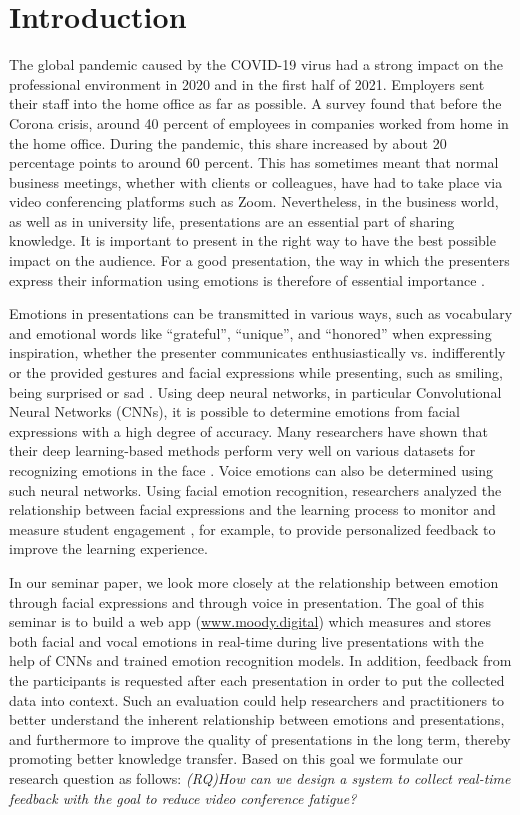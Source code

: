 \section{Introduction}
\label{sec:intro}
The global pandemic caused by the COVID-19 virus had a strong impact on the professional environment in 2020 and in the first half of 2021. Employers sent their staff into the home office as far as possible. A survey found that before the Corona crisis, around 40 percent of employees in companies worked from home in the home office. During the pandemic, this share increased by about 20 percentage points to around 60 percent. This has sometimes meant that normal business meetings, whether with clients or colleagues, have had to take place via video conferencing platforms such as Zoom. Nevertheless, in the business world, as well as in university life, presentations are an essential part of sharing knowledge. It is important to present in the right way to have the best possible impact on the audience. For a good presentation, the way in which the presenters express their information using emotions is therefore of essential importance \cite{derrico_tracking_2019}.

Emotions in presentations can be transmitted in various ways, such as vocabulary and emotional words like ``grateful'', ``unique'', and ``honored'' when expressing inspiration, whether the presenter communicates enthusiastically vs. indifferently or the provided gestures and facial expressions while presenting, such as smiling, being surprised or sad \cite{zeng_emoco_2019, rosler_reducing_2021}. Using deep neural networks, in particular Convolutional Neural Networks (CNNs), it is possible to determine emotions from facial expressions with a high degree of accuracy. Many researchers have shown that their deep learning-based methods perform very well on various datasets for recognizing emotions in the face \cite{ko_brief_2018}. Voice emotions can also be determined using such neural networks. Using facial emotion recognition, researchers analyzed the relationship between facial expressions and the learning process to monitor and measure student engagement \cite{de_carolis_engaged_2019}, for example, to provide personalized feedback to improve the learning experience. 

In our seminar paper, we look more closely at the relationship between emotion through facial expressions and through voice in presentation. The goal of this seminar is to build a web app (\url{www.moody.digital}) which measures and stores both facial and vocal emotions in real-time during live presentations with the help of CNNs and trained emotion recognition models. In addition, feedback from the participants is requested after each presentation in order to put the collected data into context. Such an evaluation could help researchers and practitioners to better understand the inherent relationship between emotions and presentations, and furthermore to improve the quality of presentations in the long term, thereby promoting better knowledge transfer. Based on this goal we formulate our research question as follows:
\vspace{1mm}
\newline
\emph{(RQ)\quad How can we design a system to collect real-time feedback with the goal to reduce video conference fatigue?}
